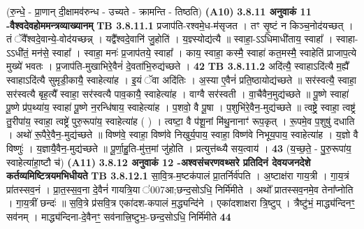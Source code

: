 \documentclass[17pt]{extarticle}
\begin{document}
{{{{{{{{{{{{{{{{{{{{{{                  \newline
                                    (रु॒न्धे॒ - प्रा॒णान् दी॒क्षामव॑रुन्ध - उच्यते - क्रामन्ति - तिष्ठति) \textbf{(A10)} \newline \newline
                \textbf{ 3.8.11    अनुवाकं   11 -वैश्वदेवहोममन्त्रव्याख्यानम्} \newline
                                \textbf{ TB 3.8.11.1} \newline
                  प्रजाप॑ति-रश्वमे॒ध-म॑सृजत । तꣳ सृ॒ष्टं न किञ्च॒नोद॑यच्छत् । तं ॅवै᳚श्वदे॒वान्ये॒-वोद॑यच्छन्न् । यद्वै᳚श्वदे॒वानि॑ जु॒होति॑ । य॒ज्ञ्स्योद्य॑त्यै ॥ स्वाहा॒-ऽऽधिमाधी॑ताय॒ स्वाहा᳚ । स्वाहा-ऽऽधी॑तं॒ मन॑से॒ स्वाहा᳚ । स्वाहा॒ मनः॑ प्र॒जाप॑तये॒ स्वाहा᳚ । काय॒ स्वाहा॒ कस्मै॒ स्वाहा॑ कत॒मस्मै॒ स्वाहेति॑ प्राजाप॒त्ये मुख्ये॑ भवतः । प्र॒जाप॑ति-मुखाभिरे॒वैनं॑ दे॒वता॑भि॒रुद्य॑च्छते । \textbf{ 42} \newline
                  \newline
                                \textbf{ TB 3.8.11.2} \newline
                  अदि॑त्यै॒ स्वाहाऽदि॑त्यै म॒ह्यै᳚ स्वाहाऽदि॑त्यै सुमृडी॒कायै॒ स्वाहेत्या॑ह । इ॒यं ॅवा अदि॑तिः । अ॒स्या ए॒वैनं॑ प्रति॒ष्ठायोद्य॑च्छते ॥ सर॑स्वत्यै॒ स्वाहा॒ सर॑स्वत्यै बृह॒त्यै᳚ स्वाहा॒ सर॑स्वत्यै पाव॒कायै॒ स्वाहेत्या॑ह । वाग्वै सर॑स्वती । वा॒चैवैन॒मुद्य॑च्छते ॥ पू॒ष्णे स्वाहा॑ पू॒ष्णे प्र॑प॒थ्या॑य॒ स्वाहा॑ पू॒ष्णे न॒रन्धि॑षाय॒ स्वाहेत्या॑ह । प॒शवो॒ वै पू॒षा । प॒शुभि॑रे॒वैन॒-मुद्य॑च्छते ॥ त्वष्ट्रे॒ स्वाहा॒ त्वष्ट्र॑ तु॒रीपा॑य॒ स्वाहा॒ त्वष्ट्रे॑ पुरु॒रूपा॑य॒ स्वाहेत्या॑ह ( ) । त्वष्टा॒ वै प॑शू॒नां मि॑थु॒नानाꣳ॑ रूप॒कृत् । रू॒पमे॒व प॒शुषु॑ दधाति । अथो॑ रू॒पैरे॒वैन॒-मुद्य॑च्छते ॥ विष्ण॑वे॒ स्वाहा॒ विष्ण॑वे निखुर्य॒पाय॒ स्वाहा॒ विष्ण॑वे निभूय॒पाय॒ स्वाहेत्या॑ह । य॒ज्ञो वै विष्णुः॑ । य॒ज्ञायै॒वैन॒-मुद्य॑च्छते ॥ पू॒र्णा॒हु॒ति-मु॑त्त॒मां जु॑होति । प्रत्युत्त॑ब्ध्यै सय॒त्वाय॑ । \textbf{ 43} \newline
                  \newline
                                    (य॒च्छ॒ते॒ - पु॒रु॒रूपा॑य॒ स्वाहेत्या॑हा॒ष्टौ च॑) \textbf{(A11)} \newline \newline
                \textbf{ 3.8.12    अनुवाकं   12 -अश्वसंचरणवथ्सरे प्रतिदिनं देवयजनदेशे कर्तव्यमिष्टित्रयमभिधीयते} \newline
                                \textbf{ TB 3.8.12.1} \newline
                  सा॒वि॒त्र-म॒ष्टक॑पालं प्रा॒तर्निर्व॑पति । अ॒ष्टाक्ष॑रा गाय॒त्री । गा॒य॒त्रं प्रा॑तस्सव॒नं । प्रा॒त॒स्स॒व॒ना दे॒वैनं॑ गायत्रि॒या ॑007आ;छन्द॒सोऽधि॒ निर्मि॑मीते । अथो᳚ प्रातस्सव॒नमे॒व तेना᳚प्नोति । गा॒य॒त्रीं छन्दः॑ ॥ स॒वि॒त्रे प्र॑सवि॒त्र एका॑दश-कपालं म॒द्ध्यन्दि॑ने । एका॑दशाक्षरा त्रि॒ष्टुप् । त्रैष्टु॑भं॒ माद्ध्य॑न्दिनꣳ॒॒ सव॑नम् । माद्ध्य॑न्दिना-दे॒वैनꣳ॒॒ सव॑नात्त्रि॒ष्टुभः॒-छन्द॒सोऽधि॒ निर्मि॑मीते \textbf{ 44} \newline
}}}}}}}}}}}}}}}}}}}}}}
\end{document}
